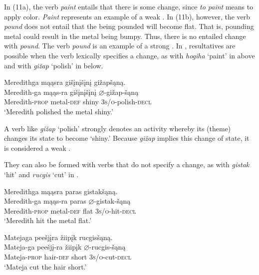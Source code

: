 \documentclass[output=paper]{LSP/langsci}
\begin{document}
\begin{exe}
\ex\label{ex:rosen:11}
\begin{xlist}



\end{xlist}
\end{exe}

In (11a), the verb \textit{paint} entails that there is some change, since \textit{to paint} means to apply color. \textit{Paint} represents an example of a weak . In (11b), however, the verb \textit{pound} does not entail that the  being pounded will become flat. That is, pounding metal could result in the metal being bumpy. Thus, there is no entailed change with \textit{pound}. The verb \textit{pound} is an example of a strong . In , resultatives are possible when the verb lexically specifies a change, as with \textit{hogiha} `paint' in  above and with \textit{gižap} `polish' in  below.

\begin{exe}
\ex\label{ex:rosen:12}
 \glll Meredithga mąąsra gišįnįšįnį gižapšąną.  \\
 Meredith-ga mąąs-ra gišįnįšįnį {$\varnothing$}-gižap-šąną\\
 Meredith-\textsc{prop} metal-\textsc{def} shiny \textsc{3s/o}-polish-\textsc{decl}\\
\glt `Meredith polished the metal shiny.'

\end{exe}

A verb like \textit{gižap} `polish' strongly denotes an activity whereby its  (theme) changes its state to become `shiny.' Because \textit{gižap} implies this change of state, it is considered a weak . 

They can also be formed with verbs that do not specify a change, as with \textit{gistak} `hit' and \textit{rucgis} `cut' in .

\begin{exe}
\ex\label{ex:rosen:13}
\begin{xlist}

\ex \glll Meredithga mąąsra paras gistakšąną. \\
 Meredith-ga mąąs-ra paras {$\varnothing$}-gistak-šąną\\
Meredith-\textsc{prop} metal-\textsc{def} flat \textsc{3s/o}-hit-\textsc{decl}\\
\glt `Meredith hit the metal flat.'

\ex \glll Matejaga peešjįra žiipįk rucgisšąną.\\
Mateja-ga peešjį-ra žiipįk {$\varnothing$}-rucgis-šąną\\
Mateja-\textsc{prop} hair-\textsc{def} short \textsc{3s/o}-cut-\textsc{decl}\\
\glt `Mateja cut the hair short.'

\end{xlist}
\end{exe}
\end{document}

